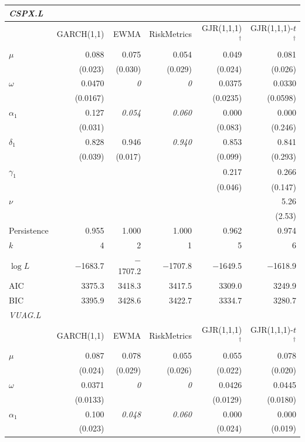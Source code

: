 \begin{tabular}{lrrrrr}
\toprule
\multicolumn{6}{l}{\textit{CSPX.L}} \\
\midrule
 & GARCH(1,1) & EWMA & RiskMetrics & GJR(1,1,1)$^\dagger$ & GJR(1,1,1)-$t$$^\dagger$ \\
\midrule
$\mu$ & 0.088 & 0.075 & 0.054 & 0.049 & 0.081 \\
 & (0.023) & (0.030) & (0.029) & (0.024) & (0.026) \\[1pt]
$\omega$ & 0.0470 & \textit{0} & \textit{0} & 0.0375 & 0.0330 \\
 & (0.0167) &  &  & (0.0235) & (0.0598) \\[1pt]
$\alpha_1$ & 0.127 & \textit{0.054} & \textit{0.060} & 0.000 & 0.000 \\
 & (0.031) &  &  & (0.083) & (0.246) \\[1pt]
$\delta_1$ & 0.828 & 0.946 & \textit{0.940} & 0.853 & 0.841 \\
 & (0.039) & (0.017) &  & (0.099) & (0.293) \\[1pt]
$\gamma_1$ &  &  &  & 0.217 & 0.266 \\
 &  &  &  & (0.046) & (0.147) \\[1pt]
$\nu$ &  &  &  &  & 5.26 \\
 &  &  &  &  & (2.53) \\[1pt]
\midrule
Persistence & 0.955 & 1.000 & 1.000 & 0.962 & 0.974 \\
$k$ & 4 & 2 & 1 & 5 & 6 \\
$\log L$ & $-$1683.7 & $-$1707.2 & $-$1707.8 & $-$1649.5 & $-$1618.9 \\
AIC & 3375.3 & 3418.3 & 3417.5 & 3309.0 & 3249.9 \\
BIC & 3395.9 & 3428.6 & 3422.7 & 3334.7 & 3280.7 \\
\midrule\midrule
\multicolumn{6}{l}{\textit{VUAG.L}} \\
 & GARCH(1,1) & EWMA & RiskMetrics & GJR(1,1,1)$^\dagger$ & GJR(1,1,1)-$t$$^\dagger$ \\
\midrule
$\mu$ & 0.087 & 0.078 & 0.055 & 0.055 & 0.078 \\
 & (0.024) & (0.029) & (0.026) & (0.022) & (0.020) \\[1pt]
$\omega$ & 0.0371 & \textit{0} & \textit{0} & 0.0426 & 0.0445 \\
 & (0.0133) &  &  & (0.0129) & (0.0180) \\[1pt]
$\alpha_1$ & 0.100 & \textit{0.048} & \textit{0.060} & 0.000 & 0.000 \\
 & (0.023) &  &  & (0.024) & (0.019) \\[1pt]

\end{tabular}
